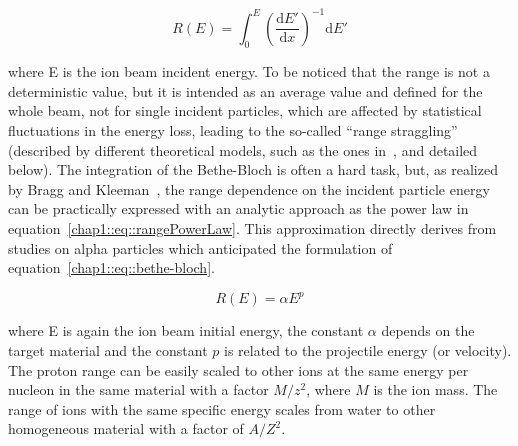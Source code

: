 \begin{equation}
R(E) = \int_{0}^{E}(\frac{\mathrm{d}E'}{\mathrm{d}x})^{-1}\mathrm{d}E' 
\label{chap1::eq::rangeIntegral}
\end{equation}

where E is the ion beam incident energy. To be noticed that the range is not a deterministic value, but it is intended as an average value and defined for the whole beam, not for single incident particles, which are affected by statistical fluctuations in the energy loss, leading to the so-called \enquote{range straggling} (described by different theoretical models, such as the ones in~\cite{Bohr1915, Landau1944, Vavilov1957}, and detailed below). The integration of the Bethe-Bloch is often a hard task, but, as realized by Bragg and Kleeman~\parencite{Bragg1905}, the range dependence on the incident particle energy can be practically expressed with an analytic approach as the power law in equation~\ref{chap1::eq::rangePowerLaw}. This approximation directly derives from studies on alpha particles which anticipated the formulation of equation~\ref{chap1::eq::bethe-bloch}.

\begin{equation}
R(E) = \alpha E^{p}
\label{chap1::eq::rangePowerLaw}
\end{equation}

where E is again the ion beam initial energy, the constant $\alpha$ depends on the target material and the constant $p$ is related to the projectile energy (or velocity). The proton range can be easily scaled to other ions at the same energy per nucleon in the same material with a factor $M/z^{2}$, where $M$ is the ion mass. The range of ions with the same specific energy scales from water to other homogeneous material with a factor of $A/Z^{2}$.



 
